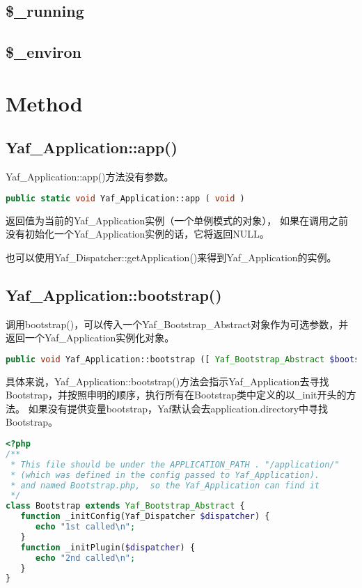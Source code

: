 \subsection{\$\_running}
\subsection{\$\_environ}

\section{Method}


\subsection{Yaf\_Application::app()}

Yaf\_Application::app()方法没有参数。

\begin{lstlisting}[language=PHP]
public static void Yaf_Application::app ( void )
\end{lstlisting}

返回值为当前的Yaf\_Application实例（一个单例模式的对象）， 如果在调用之前没有初始化一个Yaf\_Application实例的话，它将返回NULL。

也可以使用Yaf\_Dispatcher::getApplication()来得到Yaf\_Application的实例。











\subsection{Yaf\_Application::bootstrap()}

调用bootstrap()，可以传入一个Yaf\_Bootstrap\_Abstract对象作为可选参数，并返回一个Yaf\_Application实例化对象。

\begin{lstlisting}[language=PHP]
public void Yaf_Application::bootstrap ([ Yaf_Bootstrap_Abstract $bootstrap ] )
\end{lstlisting}

具体来说，Yaf\_Application::bootstrap()方法会指示Yaf\_Application去寻找Bootstrap，并按照申明的顺序，执行所有在Bootstrap类中定义的以\_init开头的方法。 如果没有提供变量bootstrap，Yaf默认会去application.directory中寻找Bootstrap。

\begin{lstlisting}[language=PHP]
<?php
/**
 * This file should be under the APPLICATION_PATH . "/application/"
 * (which was defined in the config passed to Yaf_Application).
 * and named Bootstrap.php,  so the Yaf_Application can find it 
 */
class Bootstrap extends Yaf_Bootstrap_Abstract {
   function _initConfig(Yaf_Dispatcher $dispatcher) {
      echo "1st called\n";
   }
   function _initPlugin($dispatcher) {
      echo "2nd called\n";
   }
}
\end{lstlisting}

